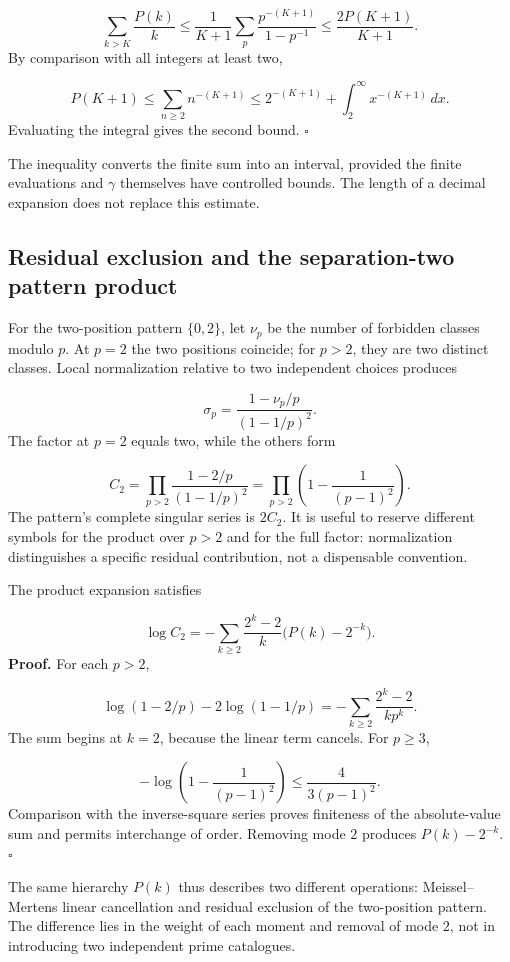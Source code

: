 \[
\sum_{k>K}\frac{P(k)}k
\le\frac1{K+1}\sum_p\frac{p^{-(K+1)}}{1-p^{-1}}
\le\frac{2P(K+1)}{K+1}.
\]
By comparison with all integers at least two,

\[
P(K+1)\le\sum_{n\ge2}n^{-(K+1)}
\le2^{-(K+1)}+\int_2^\infty x^{-(K+1)}\,dx.
\]
Evaluating the integral gives the second bound. \hfill\(\square\)

The inequality converts the finite sum into an interval, provided the finite evaluations and $\gamma$ themselves have controlled bounds. The length of a decimal expansion does not replace this estimate.

\subsection{Residual exclusion and the separation-two pattern product}
For the two-position pattern \(\{0,2\}\), let $\nu_p$ be the number of forbidden classes modulo $p$. At $p=2$ the two positions coincide; for $p>2$, they are two distinct classes. Local normalization relative to two independent choices produces

\[
\sigma_p=\frac{1-\nu_p/p}{(1-1/p)^2}.
\]
The factor at $p=2$ equals two, while the others form

\[
C_2=\prod_{p>2}\frac{1-2/p}{(1-1/p)^2}
=\prod_{p>2}\left(1-\frac1{(p-1)^2}\right).
\]
The pattern's complete singular series is $2C_2$. It is useful to reserve different symbols for the product over $p>2$ and for the full factor: normalization distinguishes a specific residual contribution, not a dispensable convention.

The product expansion satisfies

\[
\log C_2=-\sum_{k\ge2}\frac{2^k-2}{k}\bigl(P(k)-2^{-k}\bigr).
\]
\textbf{Proof.} For each $p>2$,

\[
\log(1-2/p)-2\log(1-1/p)
=-\sum_{k\ge2}\frac{2^k-2}{kp^k}.
\]
The sum begins at $k=2$, because the linear term cancels. For \(p\ge3\),

\[
-\log\left(1-\frac1{(p-1)^2}\right)\le\frac4{3(p-1)^2}.
\]
Comparison with the inverse-square series proves finiteness of the absolute-value sum and permits interchange of order. Removing mode $2$ produces $P(k)-2^{-k}$. \hfill\(\square\)

The same hierarchy $P(k)$ thus describes two different operations: Meissel–Mertens linear cancellation and residual exclusion of the two-position pattern. The difference lies in the weight of each moment and removal of mode $2$, not in introducing two independent prime catalogues.

